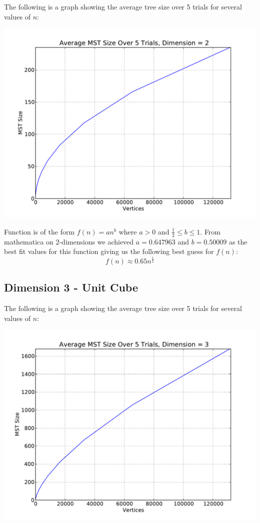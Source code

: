 \documentclass[solution, letterpaper]{cs121}
\begin{document}
The following is a graph showing the average tree size over 5 trials for several values of $n$:
\begin{center}
\includegraphics[scale=0.8]{graphs/kruskals-dimension-2.pdf}
\end{center}

Function is of the form $f(n)=an^b$ where $a > 0$ and $\frac{1}{2} \leq b \leq 1$. From mathematica on 2-dimensions we achieved $a=0.647963$ and $b=0.50009$ as the best fit values for this function giving us the following best guess for $f(n)$:
\[f(n) \approx 0.65 n^{\frac{1}{2}}\]

\pagebreak
\subsection*{Dimension 3 - Unit Cube}

The following is a graph showing the average tree size over 5 trials for several values of $n$:
\begin{center}
\includegraphics[scale=0.8]{graphs/kruskals-dimension-3.pdf}
\end{center}
\end{document}
